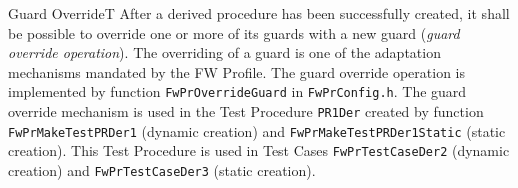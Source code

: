 \documentclass[a4paper,10pt]{article}
\newenvironment{fw_req}[6]
{\addtocounter{subsubsection}{1}
	\hspace{0.2cm}\textbf{FW-\arabic{section}.\arabic{subsection}.\arabic{subsubsection}/#2
	\hspace{0.8cm} #1}
	\vspace{-10pt}
\begin{longtable}{p{2.7cm}P{8.5cm}}
\hline
\textsc{Requirement} & #3 \\
\textsc{Justification} & #4 \\
\textsc{Implementation} & #5  \\ 
\textsc{Verification} & #6  \\
\hline
}
{\end{longtable}}
\begin{document}
\begin{fw_req}{Guard Override}{T}
{After a derived procedure has been successfully created, it shall be possible to override one or more of its guards with 
a new guard (\emph{guard override operation}).}
{The overriding of a guard is one of the adaptation mechanisms mandated by the FW Profile.}
{The guard override operation is implemented by function \texttt{FwPrOverrideGuard} in \texttt{FwPrConfig.h}.} 
{The guard override mechanism is used in the Test Procedure \texttt{PR1Der} created by function 
\texttt{FwPrMakeTestPRDer1} (dynamic creation) and \texttt{FwPrMakeTestPRDer1Static} (static creation). This Test Procedure is used in 
Test Cases \texttt{FwPrTestCaseDer2} (dynamic creation) and \texttt{FwPrTestCaseDer3} (static creation).}
\end{fw_req}


\end{document}
